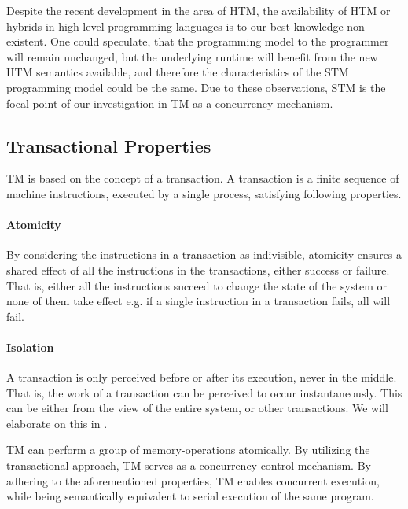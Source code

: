 Despite the recent development in the area of \ac{HTM}, the availability of \ac{HTM} or hybrids in high level programming languages is to our best knowledge non-existent. One could speculate, that the programming model to the programmer will remain unchanged, but the underlying runtime will benefit from the new \ac{HTM} semantics available, and therefore the characteristics of the \ac{STM} programming model could be the same. Due to these observations, \ac{STM} is the focal point of our investigation in \ac{TM} as a concurrency mechanism. 

\subsection{Transactional Properties}
\label{sec:stm_tm_properties}
\ac{TM} is based on the concept of a transaction. A transaction is a finite sequence of machine instructions, executed by a single process, satisfying following properties\cite[p. 2]{herlihy2011tm}.

\paragraph{Atomicity} By considering the instructions in a transaction as indivisible, atomicity ensures a shared effect of all the instructions in the transactions, either success or failure. That is, either all the instructions succeed to change the state of the system or none of them take effect e.g. if a single instruction in a transaction fails, all will fail.
\paragraph{Isolation} A transaction is only perceived before or after its execution, never in the middle. That is, the work of a transaction can be perceived to occur instantaneously. This can be either from the view of the entire system, or other transactions. We will elaborate on this in . 

\ac{TM} can perform a group of memory-operations atomically\cite[48]{harris2005composable}. By utilizing the transactional approach, \ac{TM} serves as a concurrency control mechanism. By adhering to the aforementioned properties, \ac{TM} enables concurrent execution, while being semantically equivalent to serial execution of the same program.

